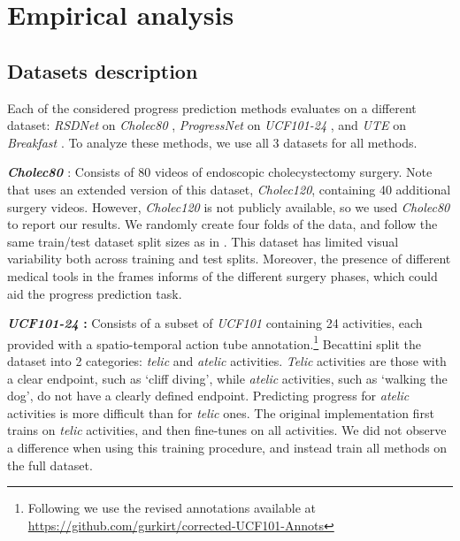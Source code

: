 \section{Empirical analysis}
\label{sec:experiment}
\subsection{Datasets description}

Each of the considered progress prediction methods evaluates on a different dataset: \textsl{RSDNet} on \textsl{Cholec80} \cite{twinanda2016}, \textsl{ProgressNet} on \textsl{UCF101-24} \cite{soomro2012}, and \textsl{UTE} on \textsl{Breakfast} \cite{kuehne2014, kuehne2016}. 
To analyze these methods, we use all 3 datasets for all methods. 

\smallskip\noindent\textbf{\textsl{Cholec80} \cite{twinanda2016}}: Consists of 80 videos of endoscopic cholecystectomy surgery.  
Note that \cite{twinanda2019} uses an extended version of this dataset, \textsl{Cholec120}, containing 40 additional surgery videos. 
However, \textsl{Cholec120} is not publicly available, so we used \textsl{Cholec80} to report our results. 
We randomly create four folds of the data, and follow the same train\slash test dataset split sizes as in \cite{twinanda2019}. 
This dataset has limited visual variability both across training and test splits.
Moreover, the presence of different medical tools in the frames informs of the different surgery phases, which could aid the progress prediction task.

\smallskip\noindent\textbf{\textsl{UCF101-24} \cite{soomro2012}:} Consists of a subset of \textsl{UCF101} containing 24 activities, each provided with a spatio-temporal action tube annotation.\footnote{Following \cite{becattini2017} we use the revised annotations available at \url{https://github.com/gurkirt/corrected-UCF101-Annots}} 
Becattini \etal \cite{becattini2017} split the dataset into 2 categories: \textsl{telic} and \textsl{atelic} activities.
\textsl{Telic} activities are those with a clear endpoint, such as `cliff diving', while \textsl{atelic} activities, such as `walking the dog', do not have a clearly defined endpoint. 
Predicting progress for \textsl{atelic} activities is more difficult than for \textsl{telic} ones.
The original implementation first trains on \textsl{telic} activities, and then fine-tunes on all activities. 
We did not observe a difference when using this training procedure, and instead train all methods on the full dataset.

